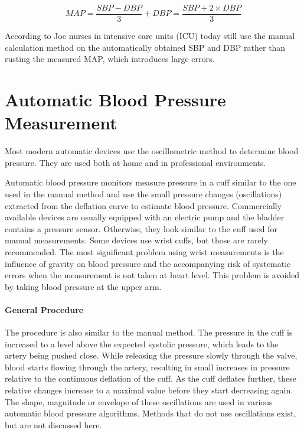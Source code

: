 \begin{equation}
\label{eq:MAP}
MAP = \frac{SBP-DBP}{3}+DBP = \frac{SBP+2\times DBP}{3}
\end{equation}

According to Joe \cite{Joe2019} nurses in intensive care units (ICU) today still use the manual calculation method on the automatically obtained SBP and DBP rather than rusting the measured MAP, which introduces large errors. %

\section{Automatic Blood Pressure Measurement}

Most modern automatic devices use the oscillometric method to determine blood pressure. They are used both at home and in professional environments.

Automatic blood pressure monitors measure pressure in a cuff similar to the one used in the manual method and use the small pressure changes (oscillations) extracted from the deflation curve to estimate blood pressure. Commercially available devices are usually equipped with an electric pump and the bladder contains a pressure sensor. Otherwise, they look similar to the cuff used for manual measurements. Some devices use wrist cuffs, but those are rarely recommended. \cite{BIHSOC2020} The most significant problem using wrist measurements is the influence of gravity on blood pressure and the accompanying risk of systematic errors when the measurement is not taken at heart level. \cite{Boron2012} This problem is avoided by taking blood pressure at the upper arm.

\paragraph{General Procedure} The procedure is also similar to the manual method. The pressure in the cuff is increased to a level above the expected systolic pressure, which leads to the artery being pushed close. While releasing the pressure slowly through the valve, blood starts flowing through the artery, resulting in small increases in pressure relative to the continuous deflation of the cuff. As the cuff deflates further, these relative changes increase to a maximal value before they start decreasing again.\cite{Forouzanfar2015,Drzewiecki1994,Ursino1996} The shape, magnitude or envelope of these oscillations are used in various automatic blood pressure algorithms. Methods that do not use oscillations exist, but are not discussed here.

